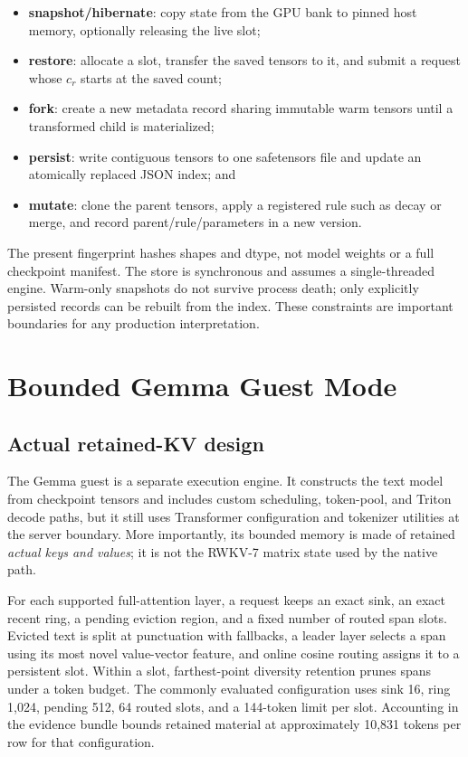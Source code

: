 \documentclass[10pt,letterpaper]{article}
\begin{document}
\begin{itemize}
  \item \textbf{snapshot/hibernate}: copy state from the GPU bank to pinned
  host memory, optionally releasing the live slot;
  \item \textbf{restore}: allocate a slot, transfer the saved tensors to it,
  and submit a request whose $c_r$ starts at the saved count;
  \item \textbf{fork}: create a new metadata record sharing immutable warm
  tensors until a transformed child is materialized;
  \item \textbf{persist}: write contiguous tensors to one safetensors file and
  update an atomically replaced JSON index; and
  \item \textbf{mutate}: clone the parent tensors, apply a registered rule such
  as decay or merge, and record parent/rule/parameters in a new version.
\end{itemize}

The present fingerprint hashes shapes and dtype, not model weights or a full
checkpoint manifest.  The store is synchronous and assumes a single-threaded
engine.  Warm-only snapshots do not survive process death; only explicitly
persisted records can be rebuilt from the index.  These constraints are
important boundaries for any production interpretation.

\section{Bounded Gemma Guest Mode}

\subsection{Actual retained-KV design}

The Gemma guest is a separate execution engine.  It constructs the text model
from checkpoint tensors and includes custom scheduling, token-pool, and Triton
decode paths, but it still uses Transformer configuration and tokenizer
utilities at the server boundary.  More importantly, its bounded memory is
made of retained \emph{actual keys and values}; it is not the RWKV-7 matrix
state used by the native path.

For each supported full-attention layer, a request keeps an exact sink, an
exact recent ring, a pending eviction region, and a fixed number of routed
span slots.  Evicted text is split at punctuation with fallbacks, a leader
layer selects a span using its most novel value-vector feature, and online
cosine routing assigns it to a persistent slot.  Within a slot, farthest-point
diversity retention prunes spans under a token budget.  The commonly evaluated
configuration uses sink 16, ring 1,024, pending 512, 64 routed slots, and a
144-token limit per slot.  Accounting in the evidence bundle bounds retained
material at approximately 10,831 tokens per row for that configuration.
\end{document}
